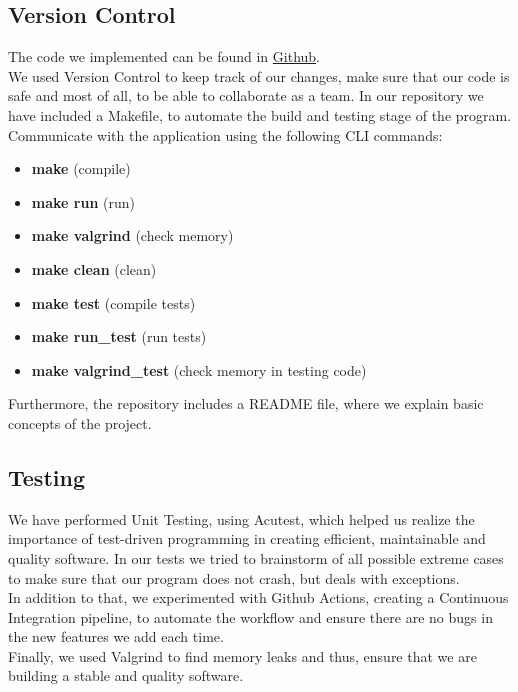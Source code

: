 \documentclass{article}
\begin{document}
\subsection{Version Control}
The code we implemented can be found in
\href{https://github.com/NefeliTav/Software-Development-for-Information-Systems}{Github}. \\
We used Version Control to keep track of our changes, make sure that our code is safe and most of all, to be able to collaborate as a team.
In our repository we have included a Makefile, to automate the build and testing stage of the program.  \\ 
Communicate with the application using the following CLI commands:
\begin{itemize}
  \item \textbf{make} (compile)
  \item \textbf{make run} (run)
  \item \textbf{make valgrind} (check memory)
  \item \textbf{make clean} (clean)
  \item \textbf{make test} (compile tests)
  \item \textbf{make run\_test} (run tests)
  \item \textbf{make valgrind\_test} (check memory in testing code)
\end{itemize}
Furthermore, the repository includes a README file, where we explain basic concepts of the project.
\subsection{Testing}
We have performed Unit Testing, using Acutest, which helped us realize the importance of test-driven programming in creating efficient, maintainable and quality software. In our tests we tried to brainstorm of all possible extreme cases to make sure that our program does not crash, but deals with exceptions.\\
In addition to that, we experimented with Github Actions, creating a Continuous Integration pipeline, to automate the workflow and ensure there are no bugs in the new features we add each time.\\
Finally, we used Valgrind to find memory leaks and thus, ensure that we are building a stable and quality software.
\end{document}
